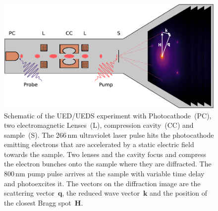 \begin{figure}[!t]
	\includegraphics[width=\columnwidth]{figs/ued.pdf}
	\caption{Schematic of the UED/UEDS experiment with Photocathode~(PC), two electromagnetic Lenses~(L), compression cavity~(CC) and sample~(S). The 266\,nm ultraviolet laser pulse hits the photocathode emitting electrons that are accelerated by a static electric field towards the sample. Two lenses and the cavity focus and compress the electron bunches onto the sample where they are diffracted. The 800\,nm pump pulse arrives at the sample with variable time delay and photoexcites it. The vectors on the diffraction image are the scattering vector~$\mathbf{q}$, the reduced wave vector~$\mathbf{k}$ and the position of the closest Bragg spot~$\mathbf{H}$.}
	\label{fig:ued}
\end{figure}

